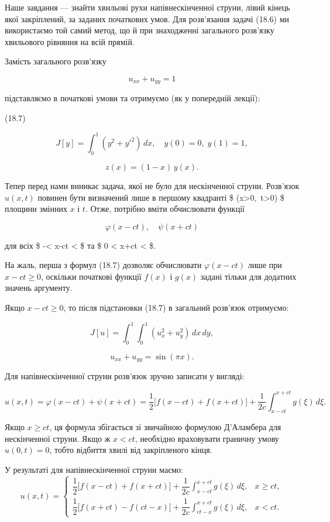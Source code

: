 \documentclass[
  ukrainian,
]{article}
\begin{document}
Наше завдання --- знайти хвильові рухи напівнескінченної струни, лівий
кінець якої закріплений, за заданих початкових умов. Для розв'язання
задачі (18.6) ми використаємо той самий метод, що й при знаходженні
загального розв'язку хвильового рівняння на всій прямій.

Замість загального розв'язку

\[ u_{xx} + u_{yy} = 1
\]

підставляємо в початкові умови та отримуємо (як у попередній лекції):

(18.7)

\[ J[y] = \int_{0}^{1} (y^{2} + {y'}^{2})\,dx,\quad y(0) = 0,\; y(1) = 1,
\]

\[ z(x) = (1 - x)\, y(x).
\]

Тепер перед нами виникає задача, якої не було для нескінченної струни.
Розв'язок \(u(x,t)\) повинен бути визначений лише в першому квадранті \$
(x\textgreater0,~t\textgreater0) \$ площини змінних \(x\) і \(t\). Отже,
потрібно вміти обчислювати функції

\[
\varphi(x-ct), \quad \psi(x+ct)
\]

для всіх \$ -\infty \textless{} x-ct \textless{} \infty \$ та \$ 0
\textless{} x+ct \textless{} \infty \$.

На жаль, перша з формул (18.7) дозволяє обчислювати \(\varphi(x-ct)\)
лише при \(x-ct \ge 0\), оскільки початкові функції \(f(x)\) і \(g(x)\)
задані тільки для додатних значень аргументу.

Якщо \(x - ct \ge 0\), то після підстановки (18.7) в загальний розв'язок
отримуємо:

\[
J[u] = \int_{0}^{1} \int_{0}^{1} (u_{x}^{2} + u_{y}^{2})\,dx\,dy,
\]

\[
u_{xx} + u_{yy} = \sin(\pi x).
\]

Для напівнескінченної струни розв'язок зручно записати у вигляді:

\[
u(x,t) = \varphi(x-ct) + \psi(x+ct)
= \frac{1}{2}\bigl[f(x-ct) + f(x+ct)\bigr] + \frac{1}{2c} \int_{x-ct}^{x+ct} g(\xi)\,d\xi.
\]

Якщо \(x \ge ct\), ця формула збігається зі звичайною формулою
Д'Аламбера для нескінченної струни. Якщо ж \(x < ct\), необхідно
враховувати граничну умову \(u(0,t)=0\), тобто відбиття хвилі від
закріпленого кінця.

У результаті для напівнескінченної струни маємо: \[
u(x,t)=
\begin{cases}
\dfrac12\bigl[f(x-ct)+f(x+ct)\bigr]+\dfrac{1}{2c}\displaystyle\int_{x-ct}^{x+ct} g(\xi)\,d\xi, & x \ge ct, \\[1.2ex]
\dfrac12\bigl[f(x+ct)-f(ct-x)\bigr]+\dfrac{1}{2c}\displaystyle\int_{ct-x}^{x+ct} g(\xi)\,d\xi, & x < ct.
\end{cases}
\]
\end{document}
